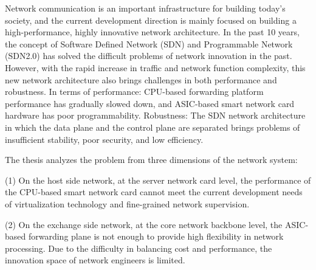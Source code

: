 
\clearpage


%

\noindent Network communication is an important infrastructure for building today's society, and the current development direction is mainly focused on building a high-performance, highly innovative network architecture. In the past 10 years, the concept of Software Defined Network (SDN) and Programmable Network (SDN2.0) has solved the difficult problems of network innovation in the past. However, with the rapid increase in traffic and network function complexity, this new network architecture also brings challenges in both performance and robustness. In terms of performance: CPU-based forwarding platform performance has gradually slowed down, and ASIC-based smart network card hardware has poor programmability. Robustness: The SDN network architecture in which the data plane and the control plane are separated brings problems of insufficient stability, poor security, and low efficiency.\newline

\noindent The thesis analyzes the problem from three dimensions of the network system: \newline

\noindent (1) On the host side network, at the server network card level, the performance of the CPU-based smart network card cannot meet the current development needs of virtualization technology and fine-grained network supervision. \newline

\noindent (2) On the exchange side network, at the core network backbone level, the ASIC-based forwarding plane is not enough to provide high flexibility in network processing. Due to the difficulty in balancing cost and performance, the innovation space of network engineers is limited. \newline

